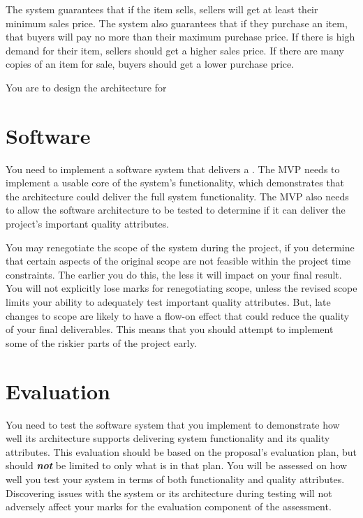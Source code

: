 \documentclass{csse4400}
\begin{document}
The system guarantees that if the item sells, sellers will get at least their minimum sales price.
The system also guarantees that if they purchase an item, that buyers will pay no more than their maximum purchase price.
If there is high demand for their item, sellers should get a higher sales price.
If there are many copies of an item for sale, buyers should get a lower purchase price.


You are to design the architecture for 


\section{Software}
You need to implement a software system that delivers a .
The MVP needs to implement a usable core of the system's functionality,
which demonstrates that the architecture could deliver the full system functionality.
The MVP also needs to allow the software architecture to be tested to determine if it can deliver the project's important quality attributes.

You may renegotiate the scope of the system during the project,
if you determine that certain aspects of the original scope are not feasible within the project time constraints.
The earlier you do this, the less it will impact on your final result.
You will not explicitly lose marks for renegotiating scope, unless the revised scope limits your ability to adequately test important quality attributes.
But, late changes to scope are likely to have a flow-on effect that could reduce the quality of your final deliverables.
This means that you should attempt to implement some of the riskier parts of the project early.


\section{Evaluation}
You need to test the software system that you implement to demonstrate
how well its architecture supports delivering system functionality and its quality attributes.
This evaluation should be based on the proposal's evaluation plan, but should \textbf{\emph{not}} be limited to only what is in that plan.
You will be assessed on how well you test your system in terms of both functionality and quality attributes.
Discovering issues with the system or its architecture during testing will not adversely affect your marks for the evaluation component of the assessment.
\end{document}
